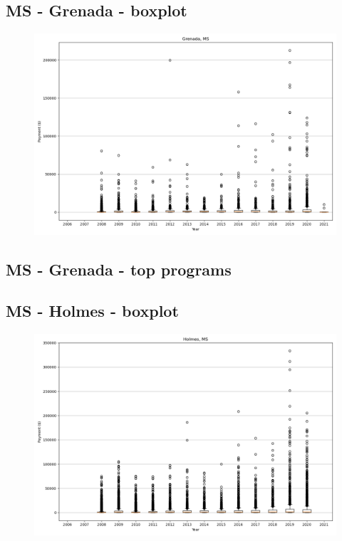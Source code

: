 \subsection*{MS - Grenada - boxplot}
\begin{figure}[h]
\centering
\includegraphics[width=7in]{../output/boxplots/counties/Grenada-MS_boxplot.png}
\end{figure}


\subsection*{MS - Grenada - top programs}

\newpage
\subsection*{MS - Holmes - boxplot}
\begin{figure}[h]
\centering
\includegraphics[width=7in]{../output/boxplots/counties/Holmes-MS_boxplot.png}
\end{figure}


